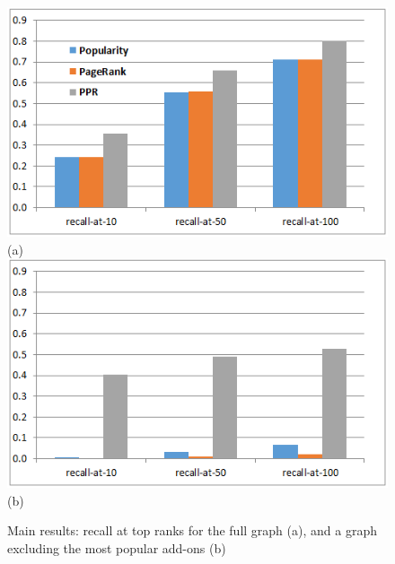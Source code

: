 \documentclass[11pt,oneside]{book}
\begin{document}
\begin{figure}[h]
\centering
	\centering
\includegraphics[scale=0.8]{figures/pop-final.png} \\
(a) \\
	\centering
\includegraphics[scale=0.8]{figures/sans-popular-final.png} \\
(b) \\
	\caption{Main results: recall at top ranks for the full graph (a), and a graph excluding the most popular add-ons (b)}
	\label{fig:main}
\end{figure}
\end{document}
